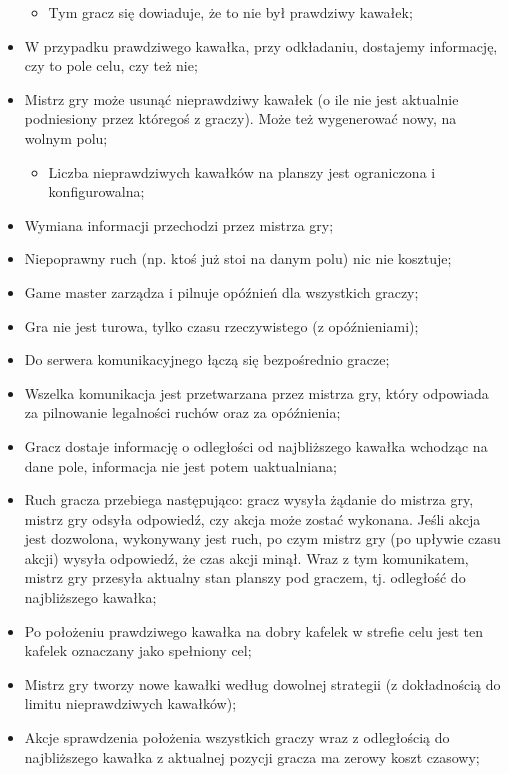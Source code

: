 \documentclass[a4paper]{article}
\begin{document}
\begin{itemize}
  \begin{itemize}
  \item
    Tym gracz się dowiaduje, że to nie był prawdziwy kawałek;
  \end{itemize}
\item
  W przypadku prawdziwego kawałka, przy odkładaniu, dostajemy informację, czy to pole celu, czy też nie;
\item
  Mistrz gry może usunąć nieprawdziwy kawałek (o ile nie jest aktualnie podniesiony przez któregoś z graczy). Może też wygenerować nowy, na wolnym polu;

  \begin{itemize}
  \item
    Liczba nieprawdziwych kawałków na planszy jest ograniczona i konfigurowalna;
  \end{itemize}
\item
  Wymiana informacji przechodzi przez mistrza gry;
\item
  Niepoprawny ruch (np. ktoś już stoi na danym polu) nic nie kosztuje;
\item
  Game master zarządza i pilnuje opóźnień dla wszystkich graczy;
\item
  Gra nie jest turowa, tylko czasu rzeczywistego (z opóźnieniami);
\item
  Do serwera komunikacyjnego łączą się bezpośrednio gracze;
\item
  Wszelka komunikacja jest przetwarzana przez mistrza gry, który odpowiada za pilnowanie legalności ruchów oraz za opóźnienia;
\item
  Gracz dostaje informację o odległości od najbliższego kawałka wchodząc na dane pole, informacja nie jest potem uaktualniana;
\item
  Ruch gracza przebiega następująco: gracz wysyła żądanie do mistrza gry, mistrz gry odsyła odpowiedź, czy akcja może zostać wykonana. Jeśli akcja jest dozwolona, wykonywany jest ruch, po czym mistrz gry (po upływie czasu akcji) wysyła odpowiedź, że czas akcji minął. Wraz z tym komunikatem, mistrz gry przesyła aktualny stan planszy pod graczem, tj. odległość do najbliższego kawałka;
\item
  Po położeniu prawdziwego kawałka na dobry kafelek w strefie celu jest ten kafelek oznaczany jako spełniony cel;
\item
  Mistrz gry tworzy nowe kawałki według dowolnej strategii (z dokładnością do limitu nieprawdziwych kawałków);
\item
  Akcje sprawdzenia położenia wszystkich graczy wraz z odległością do najbliższego kawałka z aktualnej pozycji gracza ma zerowy koszt czasowy;

\end{itemize}
\end{document}
